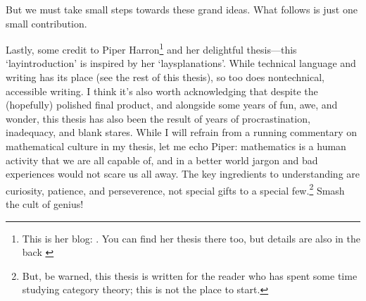 But we must take small steps towards these grand ideas. What follows is just one
small contribution.

Lastly, some credit to Piper Harron\footnote{This is her blog: . You can find
  her thesis there too, but details are also in the back \cite{Har15}} and her
  delightful thesis---this `layintroduction' is inspired by her
  `laysplanations'. While technical language and writing has its place (see the
  rest of this thesis), so too does nontechnical, accessible writing. I think
  it's also worth acknowledging that despite the (hopefully) polished final
  product, and alongside some years of fun, awe, and wonder, this thesis has
  also been the result of years of procrastination, inadequacy, and blank
  stares. While I will refrain from a running commentary on mathematical culture
  in my thesis, let me echo Piper: mathematics is a human activity that we are
  all capable of, and in a better world jargon and bad experiences would not
  scare us all away. The key ingredients to understanding are curiosity,
  patience, and perseverence, not special gifts to a special few.\footnote{But,
    be warned, this thesis is written for the reader who has spent some time
  studying category theory; this is not the place to start.} Smash the cult of genius! 

